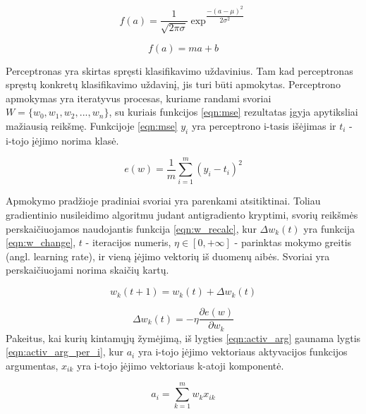 \begin{equation}
	\label{eqn:gaussian}
	f(a) = \dfrac{1}{\sqrt{2\pi\sigma}} \exp^{\dfrac{-(a - \mu)^2}{2\sigma^2}}
\end{equation}

\begin{equation}
	\label{eqn:linear}
	f(a) = ma + b
\end{equation}

Perceptronas yra skirtas spręsti klasifikavimo uždavinius. Tam kad perceptronas spręstų konkretų klasifikavimo uždavinį, jis turi būti apmokytas. Perceptrono apmokymas yra iteratyvus procesas, kuriame randami svoriai $W = \{w_{0}, w_{1}, w_{2}, ..., w_{n}\}$, su kuriais funkcijos \ref{eqn:mse} rezultatas įgyja apytiksliai mažiausią reikšmę. Funkcijoje \ref{eqn:mse} $y_i$ yra perceptrono i-tasis išėjimas ir $t_i$ - i-tojo įėjimo norima klasė.

\begin{equation}
	\label{eqn:mse}
	e(w) = \dfrac{1}{m}\sum_{i=1}^{m}(y_i - t_i)^2
\end{equation}

Apmokymo pradžioje pradiniai svoriai yra parenkami atsitiktinai. Toliau gradientinio nusileidimo algoritmu judant antigradiento kryptimi, svorių reikšmės perskaičiuojamos naudojantis funkcija \ref{eqn:w_recalc}, kur $\Delta w_k(t)$ yra funkcija \ref{eqn:w_change}, $t$ - iteracijos numeris, $\eta \in [0, +\infty]$ - parinktas mokymo greitis (angl. learning rate), ir vieną įėjimo vektorių iš duomenų aibės. Svoriai yra perskaičiuojami norima skaičių kartų.

\begin{equation}
	\label{eqn:w_recalc}
	w_k(t + 1) = w_k(t) + \Delta w_k(t)
\end{equation}

\begin{equation}
	\label{eqn:w_change}
	\Delta w_k(t) = - \eta \dfrac{\partial e(w)}{\partial w_k}
\end{equation}
Pakeitus, kai kurių kintamųjų žymėjimą, iš lygties \ref{eqn:activ_arg} gaunama lygtis \ref{eqn:activ_arg_per_i}, kur $a_i$ yra i-tojo įėjimo vektoriaus aktyvacijos funkcijos argumentas, $x_{ik}$ yra i-tojo įėjimo vektoriaus k-atoji komponentė.

\begin{equation}
	\label{eqn:activ_arg_per_i}
	a_i = \sum_{k = 1}^{m} w_{k}x_{ik}
\end{equation}

